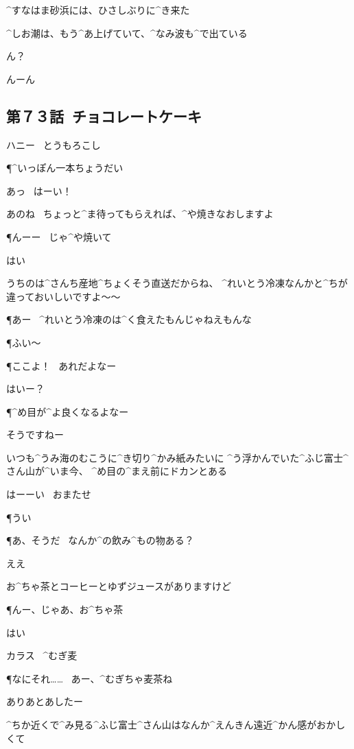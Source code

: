 \page
\T ^{すなはま}{砂浜}には、ひさしぶりに^{き}{来}た

\T ^{しお}{潮}は、もう^{あ}{上}げていて、^{なみ}{波}も^{で}{出}ている

\page[102]
\M ん？

\T んーん


\subsection{第７３話\ チョコレートケーキ}

\page[104]
\Sign ハニー
\ とうもろこし

\P ^{いっぽん}{一本}ちょうだい

\A あっ
\ はーい！

\page
\A あのね
\ ちょっと^{ま}{待}ってもらえれば、^{や}{焼}きなおしますよ

\P んーー
\ じゃ^{や}{焼}いて

\A はい

\A うちのは^{さんち}{産地}^{ちょくそう}{直送}だからね、
^{れいとう}{冷凍}なんかと^{ちが}{違}っておいしいですよ〜〜

\P あー
\ ^{れいとう}{冷凍}のは^{く}{食}えたもんじゃねえもんな

\P ふい〜

\P ここよ！
\ あれだよなー

\A はいー？

\page
\P ^{め}{目}が^{よ}{良}くなるよなー

\A そうですねー

\page[108]
\A いつも^{うみ}{海}のむこうに^{き}{切}り^{かみ}{紙}みたいに
^{う}{浮}かんでいた^{ふじ}{富士}^{さん}{山}が^{いま}{今}、
^{め}{目}の^{まえ}{前}にドカンとある

\A はーーい
\ おまたせ

\P うい

\P あ、そうだ
\ なんか^{の}{飲}み^{もの}{物}ある？

\A ええ

\page
\A お^{ちゃ}{茶}とコーヒーとゆずジュースがありますけど

\P んー、じゃあ、お^{ちゃ}{茶}

\A はい

\Sign カラス
\ ^{むぎ}{麦}

\P なにそれ……
\ あー、^{むぎちゃ}{麦茶}ね

\A ありあとあしたー

\page
\A ^{ちか}{近}くで^{み}{見}る^{ふじ}{富士}^{さん}{山}はなんか^{えんきん}{遠近}^{かん}{感}がおかしくて


